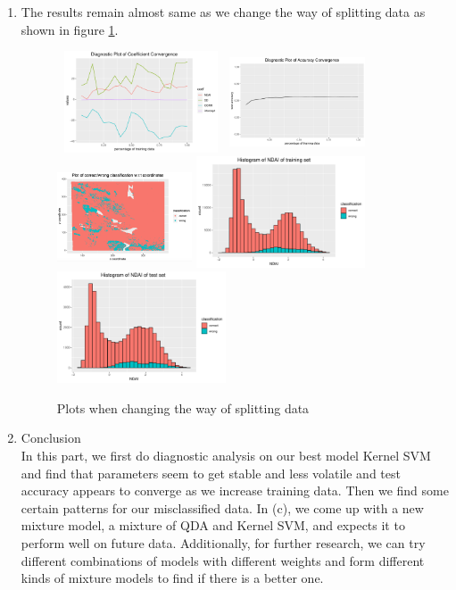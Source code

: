 \documentclass[11pt]{article}
\begin{document}
\begin{enumerate}[label=(\alph*)]
\item The results remain almost same as we change the way of splitting data as shown in figure \ref{changesplit}.

\begin{figure}[h!]
	\centering
	\includegraphics[width = 5cm,height = 3cm]{Figure/m1}
	\includegraphics[width = 4cm,height = 3cm]{Figure/m2} 
	\includegraphics[width = 4cm, height = 3cm]{Figure/coor}
	\includegraphics[width = 5cm]{Figure/hist1prime}
	\includegraphics[width = 5cm]{Figure/hist2prime}
	\caption{Plots when changing the way of splitting data}
	\label{changesplit}
\end{figure}


\item Conclusion \\
	In this part, we first do diagnostic analysis on our best model Kernel SVM and find that parameters seem to get stable and less volatile and test accuracy appears to converge as we increase training data. Then we find some certain patterns for our misclassified data. In (c), we come up with a new mixture model, a mixture of QDA and Kernel SVM, and expects it to perform well on future data. Additionally, for further research, we can try different combinations of models with different weights and form different kinds of mixture models to find if there is a better one. 
\end{enumerate}
\end{document}
